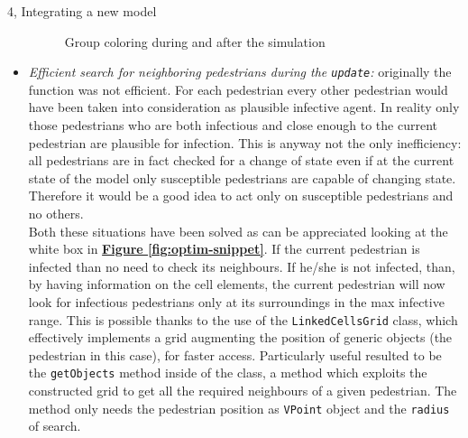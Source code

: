\documentclass[10pt,a4paper]{article}
\begin{document}
\begin{task}{4, Integrating a new model}
\begin{itemize}
\begin{figure}[!h]
  \centering
  \hspace{2cm}
\caption{Group coloring during and after the simulation}
\label{fig:group-coloring-before-after}
\end{figure}
    
\item \textit{Efficient search for neighboring pedestrians during the \texttt{update}:} originally the function was not efficient. For each pedestrian every other pedestrian would have been taken into consideration as plausible infective agent. In reality only those pedestrians who are both infectious and close enough to the current pedestrian are plausible for infection. This is anyway not the only inefficiency: all pedestrians are in fact checked for a change of state even if at the current state of the model only susceptible pedestrians are capable of changing state. Therefore it would be a good idea to act only on susceptible pedestrians and no others.\\ Both these situations have been solved as can be appreciated looking at the white box in \textbf{\hyperref[fig:optim-snippet]{Figure \ref{fig:optim-snippet}}}. If the current pedestrian is infected than no need to check its neighbours. If he/she is not infected, than, by having information on the cell elements, the current pedestrian will now look for infectious pedestrians only at its surroundings in the max infective range. This is possible thanks to the use of the \texttt{LinkedCellsGrid} class, which effectively implements a grid augmenting the position of generic objects (the pedestrian in this case), for faster access. Particularly useful resulted to be the \texttt{getObjects} method inside of the class, a method which exploits the constructed grid to get all the required neighbours of a given pedestrian. The method only needs the pedestrian position as \texttt{VPoint} object and the \texttt{radius} of search.



\end{itemize}
\end{task}
\end{document}

